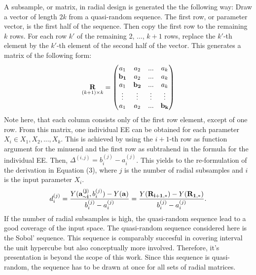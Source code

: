 \documentclass[a4paper,12pt]{article}
\begin{document}
\noindent
A subsample, or matrix, in radial design is generated the the following way: Draw a vector of length $2k$ from a quasi-random sequence. The first row, or parameter vector, is the first half of the sequence. Then copy the first row to the remaining $k$ rows. For each row $k'$ of the remaining 2, ..., $k+1$ rows, replace the $k'$-th element by the $k'$-th element of the second half of the vector. This generates a matrix of the following form:
\begin{align}
\underset{(k+1)\times k}{\bold{R}} =
\begin{pmatrix}
a_1 & a_2 & ... & a_k \\
\bold{b_1} & a_2 & ... & a_k \\
a_1 & \bold{b_2} & ... & a_k \\
\vdots & \vdots & \vdots & \vdots\\
a_1 & a_2 & ... & \bold{b_k}
\end{pmatrix}
\end{align}
\noindent
Note here, that each column consists only of the first row element, except of one row.
From this matrix, one individual EE can be obtained for each parameter $X_i \in X_1, X_2, ..., X_k$. This is achieved by using the $i+1$-th row as function argument for the minuend and the first row as subtrahend in the formula for the individual EE. Then, $\Delta^{(i,j)} = b_i^{(j)} - a_i^{(j)}$. This yields to the re-formulation of the derivation in Equation (3), where $j$ is the number of radial subsamples and $i$ is the input parameter $X_i$.
\begin{align}
d^{(j)}_i =  \frac{Y(\bold{a_{\sim i}^{(j)}}, b_i^{(j)}) - Y(\bold{a})}{b_i^{(j)} - a_i^{(j)}} = \frac{Y(\bold{R_{i+1,*}}) -  Y(\bold{R_{1,*}})}{b_i^{(j)} - a_i^{(j)}}.
\end{align}
If the number of radial subsamples is high, the quasi-random sequence lead to a good coverage of the input space. The quasi-random sequence considered here is the Sobol' sequence. This sequence is comparably succesful in covering interval the unit hypercube but also conceptually more involved. Therefore, it's presentation is beyond the scope of this work. Since this sequence is quasi-random, the sequence has to be drawn at once for all sets of radial matrices.\\
\end{document}
